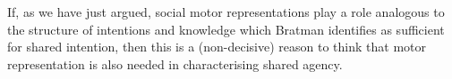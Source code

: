 \documentclass[12pt,\papersize]{extarticle}
\begin{document}
If, as we have just argued, social motor representations play a role analogous to the structure of intentions and knowledge which Bratman identifies as sufficient for shared intention, then this is a  (non-decisive) reason to think that motor representation is also needed in characterising shared agency.

%
%
%
\end{document}
